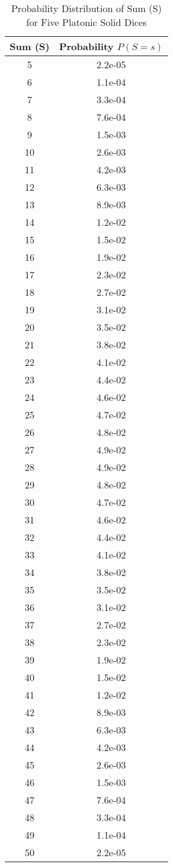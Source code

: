 \begin{table}[h]
\centering
\caption{Probability Distribution of Sum (S) for Five Platonic Solid Dices}
\begin{tabular}{|c|c|}
\hline
\textbf{Sum (S)} & \textbf{Probability \(P(S = s)\)} \\
\hline
5 & 2.2e-05 \\
6 & 1.1e-04 \\
7 & 3.3e-04 \\
8 & 7.6e-04 \\
9 & 1.5e-03 \\
10 & 2.6e-03 \\
11 & 4.2e-03 \\
12 & 6.3e-03 \\
13 & 8.9e-03 \\
14 & 1.2e-02 \\
15 & 1.5e-02 \\
16 & 1.9e-02 \\
17 & 2.3e-02 \\
18 & 2.7e-02 \\
19 & 3.1e-02 \\
20 & 3.5e-02 \\
21 & 3.8e-02 \\
22 & 4.1e-02 \\
23 & 4.4e-02 \\
24 & 4.6e-02 \\
25 & 4.7e-02 \\
26 & 4.8e-02 \\
27 & 4.9e-02 \\
28 & 4.9e-02 \\
29 & 4.8e-02 \\
30 & 4.7e-02 \\
31 & 4.6e-02 \\
32 & 4.4e-02 \\
33 & 4.1e-02 \\
34 & 3.8e-02 \\
35 & 3.5e-02 \\
36 & 3.1e-02 \\
37 & 2.7e-02 \\
38 & 2.3e-02 \\
39 & 1.9e-02 \\
40 & 1.5e-02 \\
41 & 1.2e-02 \\
42 & 8.9e-03 \\
43 & 6.3e-03 \\
44 & 4.2e-03 \\
45 & 2.6e-03 \\
46 & 1.5e-03 \\
47 & 7.6e-04 \\
48 & 3.3e-04 \\
49 & 1.1e-04 \\
50 & 2.2e-05 \\
\hline
\end{tabular}
\end{table}
